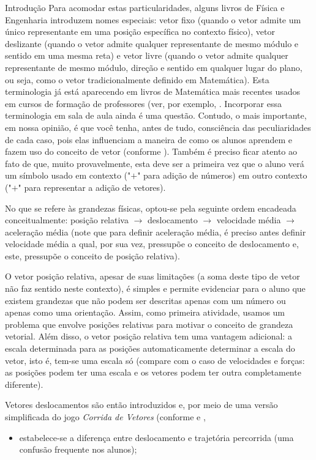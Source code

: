 \begin{apresentacao}{Introdução}
Para acomodar estas particularidades, alguns livros de Física e Engenharia introduzem nomes especiais: vetor fixo (quando o vetor admite um único representante em uma posição específica no contexto físico), vetor deslizante (quando o vetor admite qualquer representante de mesmo módulo e sentido em uma mesma reta) e vetor livre (quando o vetor admite qualquer representante de mesmo módulo, direção e sentido em qualquer lugar do plano, ou seja, como o vetor tradicionalmente definido em Matemática). Esta terminologia já está aparecendo em livros de Matemática mais recentes usados em cursos de formação de professores (ver, por exemplo, \citet{anton2007}. Incorporar essa terminologia em sala de aula ainda é uma questão. Contudo, o mais importante, em nossa opinião, é que você tenha, antes de tudo, consciência das peculiaridades de cada caso, pois elas influenciam a maneira de como os alunos aprendem e fazem uso do conceito de vetor (conforme \citet{roche1997}).
Também é preciso ficar atento ao fato de que, muito provavelmente, esta deve ser a primeira vez que o aluno verá um símbolo usado em contexto ("\(+\)"{} para adição de números) em outro contexto ("\(+\)"{} para representar a adição de vetores).

No que se refere às grandezas físicas, optou-se pela seguinte ordem encadeada conceitualmente: posição relativa \(\rightarrow\) deslocamento \(\rightarrow\) velocidade média \(\rightarrow\) aceleração média (note que para definir aceleração média, é preciso antes definir velocidade média a qual, por sua vez, pressupõe o conceito de deslocamento e, este, pressupõe o conceito de posição relativa).

O vetor posição relativa, apesar de suas limitações (a soma deste tipo de vetor não faz sentido neste contexto), é simples e permite evidenciar para o aluno que existem grandezas que não podem ser descritas apenas com um número ou apenas como uma orientação. Assim, como primeira atividade, usamos um problema que envolve posições relativas para motivar o conceito de grandeza vetorial.
Além disso, o vetor posição relativa tem uma vantagem adicional: a escala determinada para as posições automaticamente determinar a escala do vetor, isto é, tem-se uma escala só (compare com o caso de velocidades e forças: as posições podem ter uma escala e os vetores podem ter outra completamente diferente).

Vetores deslocamentos são então introduzidos e, por meio de uma versão simplificada do jogo \textit{Corrida de Vetores} (conforme \citet{gardner1973} e \citet{oliveira2009},
\begin{itemize}
\item {} 
estabelece-se a diferença entre deslocamento e trajetória percorrida (uma confusão frequente nos alunos);


\end{itemize}
\end{apresentacao}

